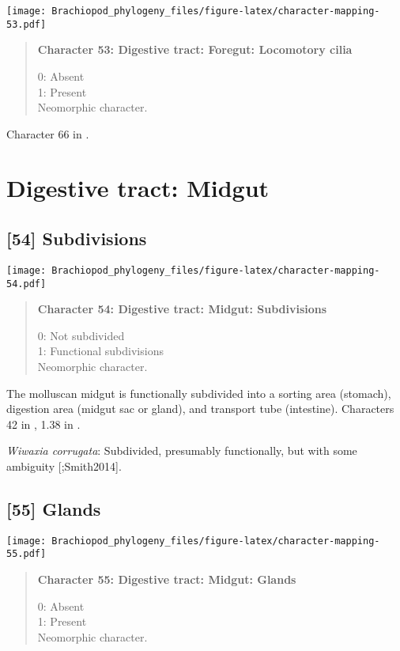 \documentclass[openany]{book}
\theoremstyle{definition}
\theoremstyle{definition}
\theoremstyle{definition}
\theoremstyle{remark}
\begin{document}
\texttt{[image: Brachiopod\_phylogeny\_files/figure-latex/character-mapping-53.pdf]}

\begin{quote}
\textbf{Character 53: Digestive tract: Foregut: Locomotory cilia}

0: Absent\\
1: Present\\
Neomorphic character.
\end{quote}

Character 66 in \citet{Haszprunar2000}.

\section{Digestive tract: Midgut}\label{digestive-tract-midgut}

\subsection*{{[}54{]} Subdivisions}\label{subdivisions}

\texttt{[image: Brachiopod\_phylogeny\_files/figure-latex/character-mapping-54.pdf]}

\begin{quote}
\textbf{Character 54: Digestive tract: Midgut: Subdivisions}

0: Not subdivided\\
1: Functional subdivisions\\
Neomorphic character.
\end{quote}

The molluscan midgut is functionally subdivided into a sorting area
(stomach), digestion area (midgut sac or gland), and transport tube
(intestine). Characters 42 in \citet{Haszprunar2000}, 1.38 in
\citet{SPS1996}.

\hypertarget{Wiwaxia_corrugata-coding-54}{}
\emph{Wiwaxia corrugata}: Subdivided, presumably functionally, but with
some ambiguity {[}\citet{Smith2012M};Smith2014{]}.

\subsection*{{[}55{]} Glands}\label{glands}

\texttt{[image: Brachiopod\_phylogeny\_files/figure-latex/character-mapping-55.pdf]}

\begin{quote}
\textbf{Character 55: Digestive tract: Midgut: Glands}

0: Absent\\
1: Present\\
Neomorphic character.
\end{quote}
\end{document}
